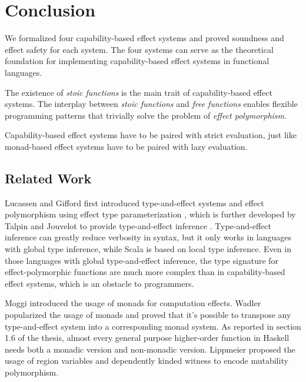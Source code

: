 \section{Conclusion}

We formalized four capability-based effect systems and proved
soundness and effect safety for each system. The four systems can
serve as the theoretical foundation for implementing capability-based
effect systems in functional languages.

The existence of \emph{stoic functions} is the main trait of
capability-based effect systems. The interplay between \emph{stoic
  functions} and \emph{free functions} enables flexible programming
patterns that trivially solve the problem of \emph{effect
  polymorphism}.

Capability-based effect systems have to be paired with strict
evaluation, just like monad-based effect systems have to be paired
with lazy evaluation.

\subsection{Related Work}

Lucassen and Gifford first introduced type-and-effect
systems\cite{gifford1986integrating} and effect polymorphism using
effect type parameterization \cite{lucassen1988polymorphic}, which is
further developed by Talpin and Jouvelot to provide type-and-effect
inference \cite{talpin1992polymorphic,
  talpin1994type}. Type-and-effect inference can greatly reduce
verbosity in syntax, but it only works in languages with global type
inference, while Scala is based on local type inference. Even in those
languages with global type-and-effect inference, the type signature
for effect-polymorphic functions are much more complex than in
capability-based effect systems, which is an obstacle to programmers.

Moggi introduced the usage of monads for computation
effects\cite{moggi1991notions}. Wadler popularized the usage of
monads\cite{wadler1992comprehending, wadler1995monads} and proved that
it's possible to transpose any type-and-effect system into a
corresponding monad system\cite{wadler2003marriage}. As reported in
section 1.6 of the thesis\cite{lippmeier2009type}, almost every
general purpose higher-order function in Haskell needs both a monadic
version and non-monadic version. Lippmeier proposed the usage of
region variables and dependently kinded witness to encode mutability
polymorphism\cite{lippmeier2009witnessing}.


